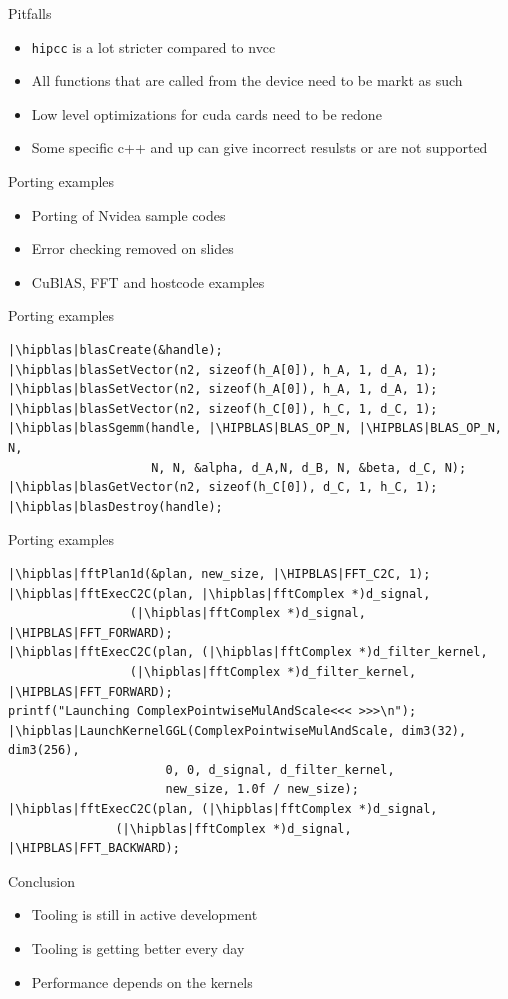 \documentclass[aspectratio=169]{beamer}
\newcommand{\hipblas}{\sout{\color{red}{cu}}\textbf{\color{green}{hip}}}
\newcommand{\HIPBLAS}{\sout{\color{red}{CU}}\textbf{\color{green}{HIP}}}
\begin{document}
\begin{frame}{Pitfalls}
\begin{itemize}
    \item \texttt{hipcc} is a lot stricter compared to nvcc
    \item All functions that are called from the device need to be markt as such
    \item Low level optimizations for cuda cards need to be redone
    \item Some specific c++ and up can give incorrect resulsts or are not supported
    
\end{itemize}
\end{frame}


\begin{frame}[fragile]{Porting examples}
\begin{itemize}
    \item Porting of Nvidea sample codes
    \item Error checking removed on slides
    \item CuBlAS, FFT and hostcode examples
\end{itemize}
\end{frame}


\begin{frame}[fragile]{Porting examples}
\begin{verbatim}
|\hipblas|blasCreate(&handle);
|\hipblas|blasSetVector(n2, sizeof(h_A[0]), h_A, 1, d_A, 1);
|\hipblas|blasSetVector(n2, sizeof(h_A[0]), h_A, 1, d_A, 1);
|\hipblas|blasSetVector(n2, sizeof(h_C[0]), h_C, 1, d_C, 1);
|\hipblas|blasSgemm(handle, |\HIPBLAS|BLAS_OP_N, |\HIPBLAS|BLAS_OP_N, N, 
                    N, N, &alpha, d_A,N, d_B, N, &beta, d_C, N);
|\hipblas|blasGetVector(n2, sizeof(h_C[0]), d_C, 1, h_C, 1);
|\hipblas|blasDestroy(handle);
\end{verbatim}
\end{frame}

\begin{frame}[fragile]{Porting examples}
\begin{verbatim}
|\hipblas|fftPlan1d(&plan, new_size, |\HIPBLAS|FFT_C2C, 1);
|\hipblas|fftExecC2C(plan, |\hipblas|fftComplex *)d_signal,
                 (|\hipblas|fftComplex *)d_signal, |\HIPBLAS|FFT_FORWARD);
|\hipblas|fftExecC2C(plan, (|\hipblas|fftComplex *)d_filter_kernel,
                 (|\hipblas|fftComplex *)d_filter_kernel, |\HIPBLAS|FFT_FORWARD);
printf("Launching ComplexPointwiseMulAndScale<<< >>>\n");
|\hipblas|LaunchKernelGGL(ComplexPointwiseMulAndScale, dim3(32), dim3(256),
                      0, 0, d_signal, d_filter_kernel,
                      new_size, 1.0f / new_size);
|\hipblas|fftExecC2C(plan, (|\hipblas|fftComplex *)d_signal,
               (|\hipblas|fftComplex *)d_signal, |\HIPBLAS|FFT_BACKWARD);
\end{verbatim}
\end{frame}

\begin{frame}[fragile]{Conclusion}
\begin{itemize}
    \item Tooling is still in active development
    \item Tooling is getting better every day
    \item Performance depends on the kernels
\end{itemize}
\end{frame}
\end{document}
